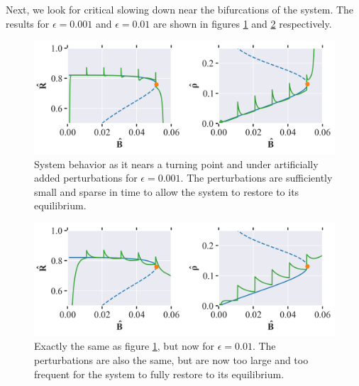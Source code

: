 Next, we look for critical slowing down near the bifurcations of the system. The results for $\epsilon = 0.001$ and $\epsilon = 0.01$ are shown in figures \ref{fig:cell_biology_critical_slowing_down_small} and \ref{fig:cell_biology_critical_slowing_down_big} respectively.
\begin{figure}[H]
    \centering
    \includegraphics[width= \textwidth]{figures/cb_critslow_R(0)=0.0_rho(0)=0.0_B(0)_0.001_eps=0.001_Bmax=0.04.png}
    \caption{System behavior as it nears a turning point and under artificially added perturbations for $\epsilon = 0.001$. The perturbations are sufficiently 
    small and sparse in time to allow the system to restore to its equilibrium.}
    \label{fig:cell_biology_critical_slowing_down_small}
\end{figure}

\begin{figure}[H]
    \centering
    \includegraphics[width= \textwidth]{figures/cb_critslow_R(0)=0.0_rho(0)=0.0_B(0)_0.001_eps=0.01_Bmax=0.04.png}
    \caption{Exactly the same as figure \ref{fig:cell_biology_critical_slowing_down_small}, but now for $\epsilon = 0.01$. The perturbations are also the same,
    but are now too large and too frequent for the system to fully restore to its equilibrium.}
    \label{fig:cell_biology_critical_slowing_down_big}
\end{figure}

